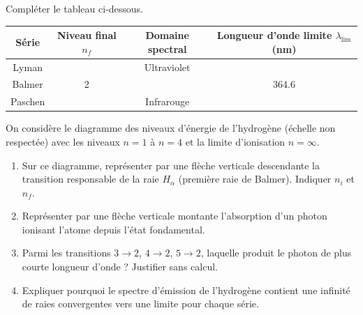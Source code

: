 \documentclass[11pt]{article}
\begin{document}
\begin{exercice}
Compléter le tableau ci-dessous.
\begin{center}
\begin{tabular}{|c|c|c|c|}
\hline
\textbf{Série} & \textbf{Niveau final $n_f$} & \textbf{Domaine spectral} & \textbf{Longueur d'onde limite $\lambda_{\text{lim}}$ (nm)} \\
\hline
Lyman & & Ultraviolet & \\
\hline
Balmer & 2 & & \SI{364,6}{} \\
\hline
Paschen & & Infrarouge & \\
\hline
\end{tabular}
\end{center}
\end{exercice}

\begin{exercice}
On considère le diagramme des niveaux d'énergie de l'hydrogène (échelle non respectée) avec les niveaux $n=1$ à $n=4$ et la limite d'ionisation $n=\infty$.
\begin{enumerate}
    \item Sur ce diagramme, représenter par une flèche verticale descendante la transition responsable de la raie $H_\alpha$ (premi\`ere raie de Balmer). Indiquer $n_i$ et $n_f$.
    \item Représenter par une flèche verticale montante l'absorption d'un photon ionisant l'atome depuis l'état fondamental.
    \item Parmi les transitions $3\to2$, $4\to2$, $5\to2$, laquelle produit le photon de plus courte longueur d'onde ? Justifier sans calcul.
    \item Expliquer pourquoi le spectre d'émission de l'hydrogène contient une infinité de raies convergentes vers une limite pour chaque série.
\end{enumerate}
\end{exercice}
\end{document}
